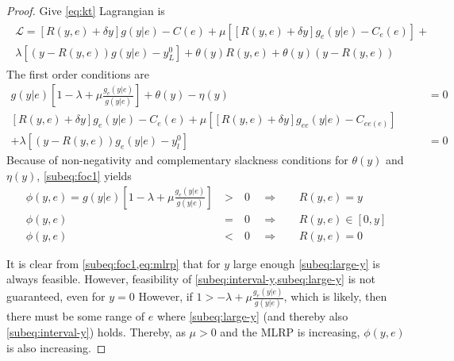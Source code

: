 	\begin{proof}
								
		Give \cref{eq:kt}  Lagrangian is
		\begin{align}
			\begin{split}                                                                    
			\mathcal{L}=[R(y,e)+\delta y]g(y|e)-C(e)+\mu [[R(y,e)+\delta y]g_e(y|e)-C_e(e)]+ \\ 
			\lambda [(y-R(y,e))g(y|e)-y_L^0]+\theta(y) R(y,e)+\theta(y)\left(y-R(y,e)\right) 
			\end{split}                                                                      
		\end{align}
		The first order conditions are
		\begin{subequations}
			\label{eq:foc}
			\begin{align}
				g(y|e)\left[1-\lambda+\mu \frac{g_e(y|e)}{g(y|e)}\right] +\theta(y)-\eta(y)                     & =0 \label{subeq:foc1} \\
				[R(y,e)+\delta y]g_e(y|e)-C_e(e)+\mu\left[[R(y,e)+\delta y]g_{ee}(y|e)- C_{ee(e)}\right] \qquad & \nonumber             \\ 
				+\lambda\left[(y-R(y,e)) g_e(y|e)-y_l^0\right]                                                  & =0 \label{subeq:foc2} 
			\end{align}
		\end{subequations}
		Because of non-negativity and complementary slackness conditions for $\theta(y)$ and $\eta(y)$, \cref{subeq:foc1} yields
		\begin{subequations}
			\label{eq:KT-analysis}
			\begin{alignat}{3}
				\phi(y,e) = g(y|e)\left[1-\lambda+\mu \frac{g_e(y|e)}{g(y|e)}\right]
				          & \: > \: & 0 & \enspace \Rightarrow &   & \enspace R(y,e)=y \label{subeq:large-y}           \\
				\phi(y,e) & \: = \: & 0 & \enspace \Rightarrow &   & \enspace R(y,e)\in [0,y] \label{subeq:interval-y} \\
				\phi(y,e) & \: < \: & 0 & \enspace \Rightarrow &   & \enspace R(y,e) =0 \label{subeq:small-y}          
			\end{alignat}
		\end{subequations}
								
		It is clear from \cref{subeq:foc1,eq:mlrp} that for $y$ large enough \cref{subeq:large-y} is always feasible. However, feasibility of \cref{subeq:interval-y,subeq:large-y} is not guaranteed, even for $y=0$ However, if $1>-\lambda+\mu \frac{g_e(y|e)}{g(y|e)}$, which is likely, then there must be some range of $e$ where \cref{subeq:large-y} (and thereby also \cref{subeq:interval-y}) holds. Thereby, as $\mu>0$ and the MLRP is increasing, $\phi(y,e)$ is also increasing.
								

\end{proof}
